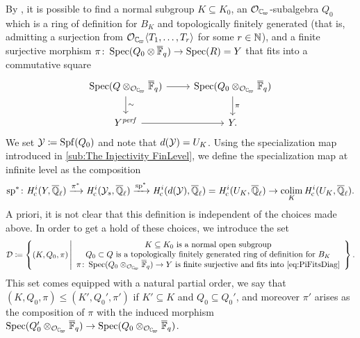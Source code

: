 \documentclass[../main.tex]{subfiles}
\begin{document}
By \cite[Lemma 3.16]{mieda2016geometric}, it is possible to find a normal
subgroup $K \subseteq K_0$,
an $\cO_\Cp$-subalgebra $Q_0$ which is a ring of definition for $B_K$ and topologically finitely generated (that is,
admitting a surjection from $\cO_\Cp \langle T_1, \dots, T_r \rangle$ for some $r
\in \mathbb{N}$), and a finite surjective morphism $\pi\colon \operatorname{Spec}(Q_0 \otimes {\overline{\mathbb{F}}_q})
\to \operatorname{Spec}(R) = Y$ that fits into a commutative square
\begin{equation}\label{eq:PiFitsDiag}
\begin{tikzcd}[ampersand replacement=\&]
  {\spec(Q \otimes_{\cO_\Cp} \Fqbar)} \& {\spec(Q_0 \otimes_{\cO_\Cp}\Fqbar)} \\
	{Y^\perf} \& {Y.}
	\arrow[from=1-1, to=1-2]
	\arrow["\sim", from=1-1, to=2-1]
	\arrow["\pi", from=1-2, to=2-2]
	\arrow[from=2-1, to=2-2]
\end{tikzcd}
\end{equation}
We set $\mathcal{Y} \coloneqq \operatorname{Spf}(Q_0)$ and note that $d(\mathcal{Y}) = U_K$. Using the
specialization map introduced in \cref{sub:The Injectivity FinLevel}, we define
the specialization map at infinite level as the composition
\begin{equation} \label{eq:DefSpecMapAtInfLevel}
  \mathrm{sp}^*\colon \mathit H_{\mathrm{c}}^i(Y, {\overline {\mathbb{Q}}_\ell}) \xrightarrow{\pi^*} \mathit H_{\mathrm{c}}^i(\mathcal{Y}_s, {\overline {\mathbb{Q}}_\ell}) 
  \xrightarrow{\mathrm{sp}^*} \mathit H_{\mathrm{c}}^i(d(\mathcal{Y}), {\overline {\mathbb{Q}}_\ell}) = \mathit H_{\mathrm{c}}^i(U_K, {\overline {\mathbb{Q}}_\ell})
  \to \operatorname*{colim}_K \mathit H_{\mathrm{c}}^i(U_K, {\overline {\mathbb{Q}}_\ell}).
\end{equation}
A priori, it is not clear that this definition is independent of the choices made 
above. In order to get a hold of these choices, we introduce the set
\begin{equation*}
  \cD \coloneqq \left\{ (K, Q_0, \pi) \, \middle \vert \begin{array}c
      K \subseteq K_0 \text{ is a normal open subgroup} \\
      Q_0 \subset Q \text{ is a topologically finitely generated ring of definition 
      for $B_K$} \\
      \pi\colon \spec(Q_0 \otimes_{\cO_\Cp} \Fqbar) \to Y \text{ is finite
        surjective and fits into \eqref{eq:PiFitsDiag}}
  \end{array}\right\}.
\end{equation*}
This set comes equipped with a natural partial order, we say that 
$(K, Q_0, \pi) \leq (K', Q_0', \pi')$ if $K' \subseteq K$ and $Q_0 \subseteq Q_0'$,
and moreover $\pi'$ arises as the composition of $\pi$ with the induced morphism 
$\spec(Q_0' \otimes_{\cO_\Cp} \Fqbar) \to \spec(Q_0 \otimes_{\cO_\Cp} \Fqbar)$. 
\end{document}
